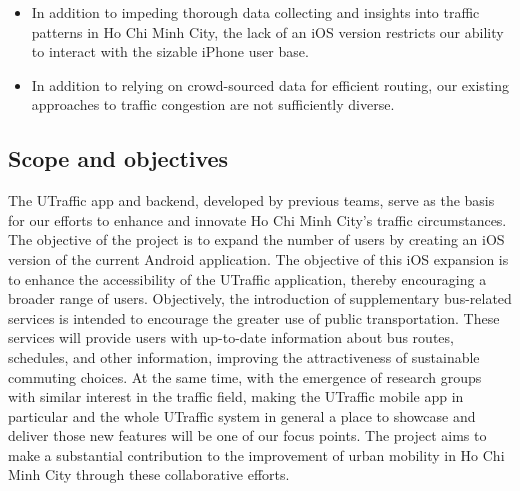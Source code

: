 \begin{itemize}
    \item In addition to impeding thorough data collecting and insights into traffic patterns in Ho Chi Minh City, the lack of an iOS version restricts our ability to interact with the sizable iPhone user base.
    
    \item In addition to relying on crowd-sourced data for efficient routing, our existing approaches to traffic congestion are not sufficiently diverse.
\end{itemize}


\subsection{Scope and objectives}

The UTraffic app and backend, developed by previous teams, serve as the basis for our efforts to enhance and innovate Ho Chi Minh City's traffic circumstances. The objective of the project is to expand the number of users by creating an iOS version of the current Android application. The objective of this iOS expansion is to enhance the accessibility of the UTraffic application, thereby encouraging a broader range of users. Objectively, the introduction of supplementary bus-related services is intended to encourage the greater use of public transportation. These services will provide users with up-to-date information about bus routes, schedules, and other information, improving the attractiveness of sustainable commuting choices. At the same time, with the emergence of research groups with similar interest in the traffic field, making the UTraffic mobile app in particular and the whole UTraffic system in general a place to showcase and deliver those new features will be one of our focus points. The project aims to make a substantial contribution to the improvement of urban mobility in Ho Chi Minh City through these collaborative efforts.

